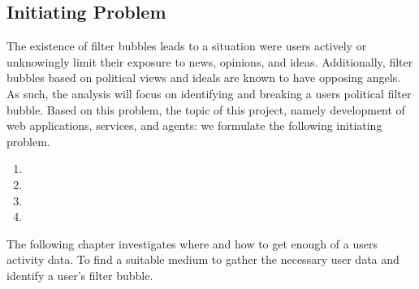 \subsection*{Initiating Problem} 
The existence of filter bubbles leads to a situation were users actively or
unknowingly limit their exposure to news, opinions, and ideas. Additionally,
filter bubbles based on political views and ideals are known to have opposing
angels. As such, the analysis will focus on identifying and breaking a users
political filter bubble. Based on this problem, the topic of this project,
namely development of web applications, services, and agents: we formulate the
following initiating problem.


\begin{center}
\begin{minipage}{0.95\linewidth}

\begin{enumerate}
  \item {}
  
  \item {}
  
  \item {}
  
  \item {}
  
\end{enumerate}

\end{minipage}
\end{center}

\nl \nl \nl 
The following chapter investigates where and how to get enough of a users
activity data. To find a suitable medium to gather the necessary user data and
identify a user's filter bubble.

